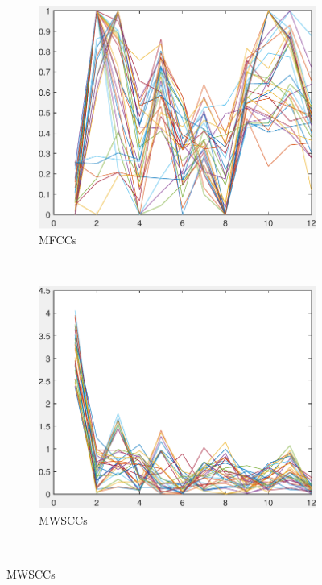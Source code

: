 \begin{figure}[htb!]
\centering
        \begin{subfigure}[b]{0.5\textwidth}
                \includegraphics[width=\textwidth]{image/Ch5/MFCC.pdf}
                \caption{MFCCs}
        \end{subfigure}%
        ~ 
        \begin{subfigure}[b]{0.5\textwidth}
                \includegraphics[width=\textwidth]{image/Ch5/MelCC.pdf}
                \caption{MWSCCs}
        \end{subfigure}
        \\

\end{figure}
